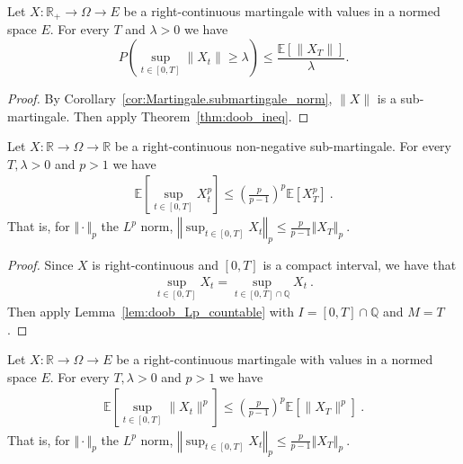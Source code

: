 \begin{corollary}\label{cor:doob_ineq_norm}
  \leanok
  Let $X:\mathbb{R}_+ \to \Omega \to E$ be a right-continuous martingale with values in a normed space $E$.
  For every $T$ and $\lambda>0$ we have
  $$
  P\left( \sup_{t\in[0,T]} \lVert X_t \rVert \geq \lambda \right)
  \leq \frac{\mathbb{E}[\lVert X_T \rVert]}{\lambda}.
  $$
\end{corollary}

\begin{proof}
  By Corollary~\ref{cor:Martingale.submartingale_norm}, $\lVert X \rVert$ is a sub-martingale.
  Then apply Theorem~\ref{thm:doob_ineq}.
\end{proof}


\begin{theorem}\label{thm:doob_lp}
  Let $X:\mathbb{R} \rightarrow \Omega \rightarrow \mathbb{R}$ be a right-continuous non-negative sub-martingale.
  For every $T, \lambda>0$ and $p>1$ we have
  \begin{align*}
    \mathbb{E}\left[ \sup_{t\in[0,T]}X_t^p \right]
    \leq \left(\frac{p}{p-1}\right)^p\mathbb{E}[X_T^p]
    \: .
  \end{align*}
  That is, for $\Vert \cdot \Vert_p$ the $L^p$ norm,
  $\left\Vert \sup_{t\in[0,T]}  X_t  \right\Vert_p
    \leq \frac{p}{p-1} \left\Vert X_T \right\Vert_p
    \: .$
\end{theorem}

\begin{proof}
Since $X$ is right-continuous and $[0,T]$ is a compact interval, we have that
\begin{align*}
  \sup_{t\in[0,T]}X_t = \sup_{t\in[0,T] \cap \mathbb{Q}}X_t
  \: .
\end{align*}
Then apply Lemma~\ref{lem:doob_Lp_countable} with $I = [0,T] \cap \mathbb{Q}$ and $M = T$.
\end{proof}


\begin{corollary}\label{cor:doob_lp_norm}
  Let $X : \mathbb{R} \rightarrow \Omega\rightarrow E$ be a right-continuous martingale with values in a normed space $E$.
  For every $T, \lambda>0$ and $p>1$ we have
  \begin{align*}
    \mathbb{E}\left[ \sup_{t\in[0,T]} \lVert X_t \rVert ^ p \right]
    \leq \left(\frac{p}{p-1}\right)^p\mathbb{E}[\lVert X_T \rVert ^p]
    \: .
  \end{align*}
  That is, for $\Vert \cdot \Vert_p$ the $L^p$ norm,
  $\left\Vert \sup_{t\in[0,T]}  X_t  \right\Vert_p
    \leq \frac{p}{p-1} \left\Vert X_T \right\Vert_p
    \: .$
\end{corollary}

